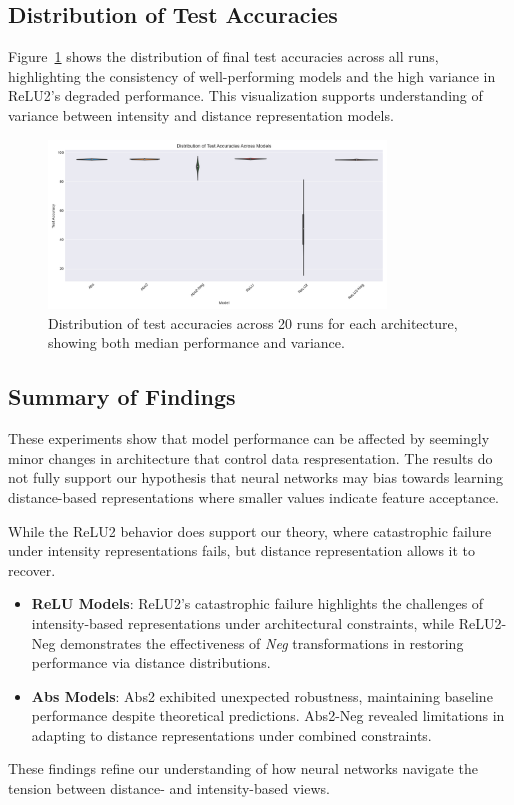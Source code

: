 \subsection{Distribution of Test Accuracies}
Figure~\ref{fig:test_dist} shows the distribution of final test accuracies across all runs, highlighting the consistency of well-performing models and the high variance in ReLU2's degraded performance. This visualization supports understanding of variance between intensity and distance representation models.

\begin{figure}[ht]
\centering
\includegraphics[width=0.8\textwidth]{images/accuracy_distribution.png}
\caption{Distribution of test accuracies across 20 runs for each architecture, showing both median performance and variance.}
\label{fig:test_dist}
\end{figure}

\subsection{Summary of Findings}

These experiments show that model performance can be affected by seemingly minor changes in architecture that control data respresentation. The results do not fully support our hypothesis that neural networks may bias towards learning distance-based representations where smaller values indicate feature acceptance.

While the ReLU2 behavior does support our theory, where catastrophic failure under intensity representations fails, but distance representation allows it to recover.

\begin{itemize}
    \item \textbf{ReLU Models}: ReLU2's catastrophic failure highlights the challenges of intensity-based representations under architectural constraints, while ReLU2-Neg demonstrates the effectiveness of \textit{Neg} transformations in restoring performance via distance distributions.
    \item \textbf{Abs Models}: Abs2 exhibited unexpected robustness, maintaining baseline performance despite theoretical predictions. Abs2-Neg revealed limitations in adapting to distance representations under combined constraints.
\end{itemize}
These findings refine our understanding of how neural networks navigate the tension between distance- and intensity-based views.
